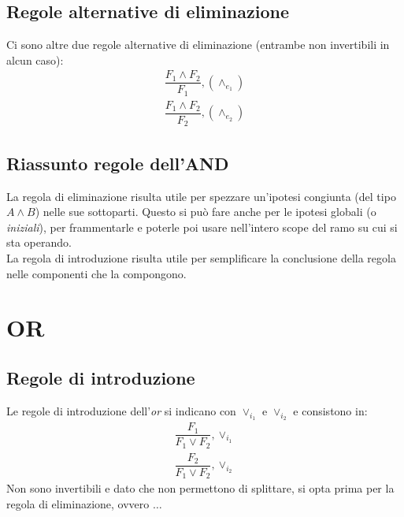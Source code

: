 \documentclass[12pt]{article}
\begin{document}
\subsection{Regole alternative di eliminazione}
\label{ssec:and_elim_alternatives}
Ci sono altre due regole alternative di eliminazione (entrambe non invertibili in alcun caso):
\begin{gather}
    \dfrac{F_1 \wedge F_2}{F_1}, (\wedge_{e_1}) \label{rule:and_elim_1}\\
    \dfrac{F_1 \wedge F_2}{F_2}, (\wedge_{e_2}) \label{rule:and_elim_2}
\end{gather}

\subsection{Riassunto regole dell'AND}
\label{ssec:and_rules}
La regola di eliminazione risulta utile per spezzare un'ipotesi congiunta (del tipo $A \wedge B$) nelle sue sottoparti. Questo si può fare anche per le ipotesi globali (o \textit{iniziali}), per frammentarle e poterle poi usare nell'intero scope del ramo su cui si sta operando.\\
La regola di introduzione risulta utile per semplificare la conclusione della regola nelle componenti che la compongono.

\pagebreak

\section{OR}
\label{sec:or}
\subsection{Regole di introduzione}
\label{ssec:or_intro}
Le regole di introduzione dell'\textit{or} si indicano con $\vee_{i_1}$ e $\vee_{i_2}$ e consistono in:
\begin{gather}
    \dfrac{F_1}{F_1 \vee F_2},\vee_{i_1}  \label{rule:or_intro_1}\\
    \dfrac{F_2}{F_1 \vee F_2},\vee_{i_2}  \label{rule:or_intro_2}
\end{gather}
Non sono invertibili e dato che non permettono di splittare, si opta prima per la regola di eliminazione, ovvero $\dots$
\end{document}
